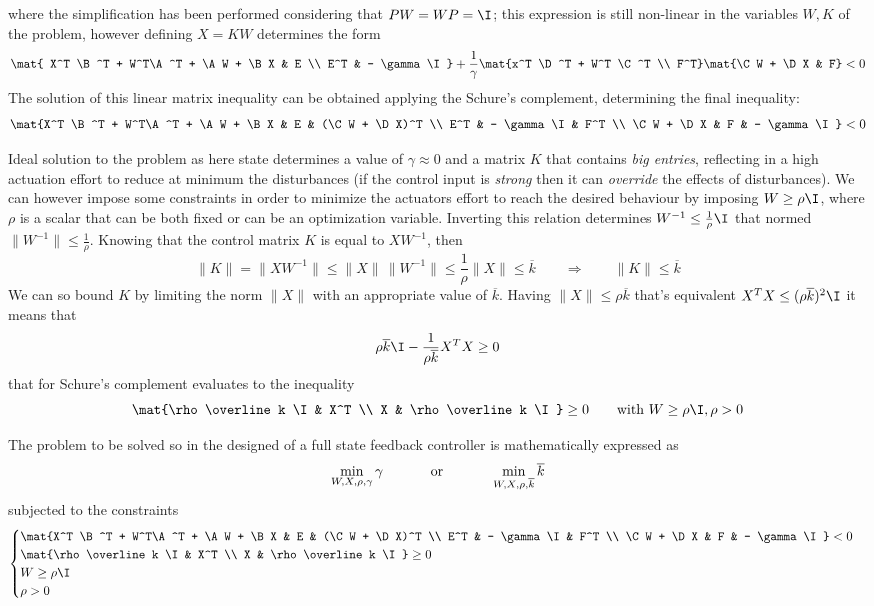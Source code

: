 	where the simplification has been performed considering that $PW = WP = \I$; this expression is still non-linear in the variables $W,K$ of the problem, however defining $X = KW$ determines the form
	\[ \mat{ X^T \B^T + W^T\A^T + \A W + \B X & E \\ E^T & - \gamma \I } + \frac 1 \gamma \mat{x^T \D^T + W^T \C^T \\ F^T} \mat{\C W + \D X & F} < 0 \]
	The solution of this linear matrix inequality can be obtained applying the Schure's complement, determining the final inequality:
	\[ \mat{X^T \B^T + W^T\A^T + \A W + \B X & E & (\C W + \D X)^T \\ 
		E^T & - \gamma \I & F^T \\
	\C W + \D X & F & - \gamma \I} < 0 \]
	
	Ideal solution to the problem as here state determines a value of $\gamma \approx 0$ and a matrix $K$ that contains \textit{big entries}, reflecting in a high actuation effort to reduce at minimum the disturbances (if the control input is \textit{strong} then it can \textit{override} the effects of disturbances). We can however impose some constraints in order to minimize the actuators effort to reach the desired behaviour by imposing $W \geq \rho \I$, where $\rho$ is a scalar that can be both fixed or can be an optimization variable. Inverting this relation determines $W^{-1} \leq \frac 1 \rho \I$ that normed $\|W^{-1} \| \leq \frac 1 \rho$. Knowing that the control matrix $K$ is equal to $XW^{-1}$, then
	\[ \|K\| = \|XW^{-1}\| \leq \|X\|\, \|W^{-1}\| \leq \frac 1 \rho \|X\| \leq \overline k \qquad \Rightarrow \qquad \|K\|\leq \overline k \]
	We can so bound $K$ by limiting the norm $\|X\|$ with an appropriate value of $\overline k$. Having $\|X\|\leq \rho \overline k$ that's equivalent $X^TX \leq (\rho \overline k)^2 \I$ it means that 
	\[ \rho \overline k \I - \frac 1 {\rho \overline k} X^T X \geq 0 \]
	that for Schure's complement evaluates to the inequality
	\[ \mat{\rho \overline k \I & X^T \\ X & \rho \overline k \I} \geq 0 \qquad \textrm{with } W \geq \rho \I , \rho > 0 \]
	
	The problem to be solved so in the designed of a full state feedback controller is mathematically expressed as
	\[ \min_{W,X,\rho,\gamma} \gamma \hspace{1.2cm} \textrm{or} \hspace{1.2cm} \min_{W,X,\rho,\overline k} \overline k \]
	subjected to the constraints
	\[ \begin{cases}
		\mat{X^T \B^T + W^T\A^T + \A W + \B X & E & (\C W + \D X)^T \\ 
			E^T & - \gamma \I & F^T \\
			\C W + \D X & F & - \gamma \I} < 0 \\
		\mat{\rho \overline k \I & X^T \\ X & \rho \overline k \I} \geq 0 \\
		W \geq \rho \I \\
		\rho > 0
	\end{cases} \]
	
	
	
	
	
	
	
	
	